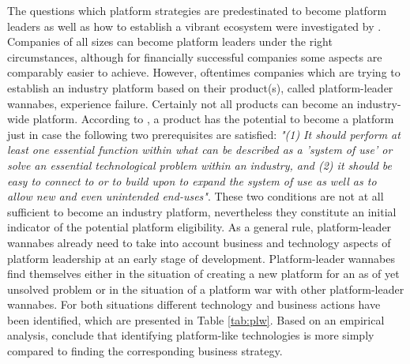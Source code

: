 The questions which platform strategies are predestinated to become platform leaders as well as how to establish a vibrant ecosystem were investigated by \citet{Gawer2008}. Companies of all sizes can become platform leaders under the right circumstances, although for financially successful companies some aspects are comparably easier to achieve. However, oftentimes companies which are trying to establish an industry platform based on their product(s), called platform-leader wannabes, experience failure. Certainly not all products can become an industry-wide platform. According to \citet[p. 29]{Gawer2008}, a product has the potential to become a platform just in case the following two prerequisites are satisfied: \textit{"(1) It should perform at least one essential function within what can be described as a 'system of use' or solve an essential technological problem within an industry, and (2) it should be easy to connect to or to build upon to expand the system of use as well as to allow new and even unintended end-uses"}. These two conditions are not at all sufficient to become an industry platform, nevertheless they constitute an initial indicator of the potential platform eligibility. As a general rule, platform-leader wannabes already need to take into account business and technology aspects of platform leadership at an early stage of development. Platform-leader wannabes find themselves either in the situation of creating a new platform for an as of yet unsolved problem or in the situation of a platform war with other platform-leader wannabes. For both situations different technology and business actions have been identified, which are presented in Table \ref{tab:plw}. Based on an empirical analysis, \citet{Gawer2008} conclude that identifying platform-like technologies is more simply compared to finding the corresponding business strategy.

